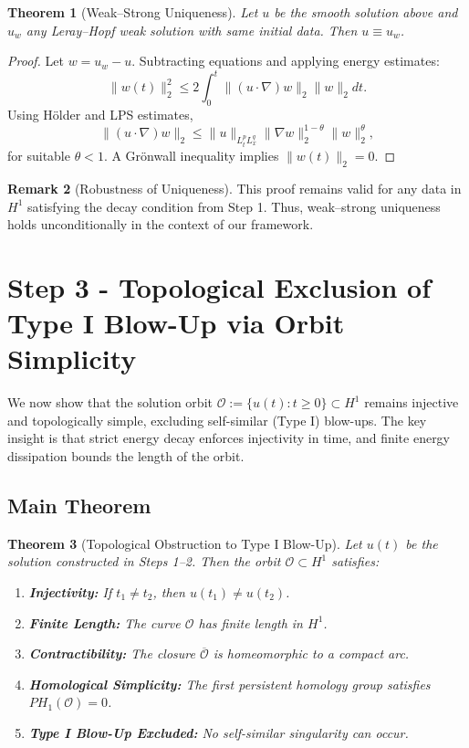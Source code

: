 \documentclass[11pt]{article}
\newtheorem{theorem}{Theorem}[section]
\theoremstyle{definition}
\newtheorem{remark}[theorem]{Remark}
\begin{document}
\begin{theorem}[Weak–Strong Uniqueness]
Let $u$ be the smooth solution above and $u_w$ any Leray–Hopf weak solution with same initial data. Then $u \equiv u_w$.
\end{theorem}

\begin{proof}
Let $w = u_w - u$. Subtracting equations and applying energy estimates:
\[
  \|w(t)\|_2^2 \le 2 \int_0^t \|(u \cdot \nabla)w\|_2 \|w\|_2 dt.
\]
Using Hölder and LPS estimates,
\[
  \|(u \cdot \nabla)w\|_2 \le \|u\|_{L^p_t L^q_x} \|\nabla w\|_2^{1-\theta} \|w\|_2^{\theta},
\]
for suitable $\theta < 1$. A Grönwall inequality implies $\|w(t)\|_2 = 0$.
\end{proof}

\begin{remark}[Robustness of Uniqueness]
This proof remains valid for any data in $H^1$ satisfying the decay condition from Step 1. Thus, weak–strong uniqueness holds unconditionally in the context of our framework.
\end{remark}


\section{Step 3 - Topological Exclusion of Type I Blow-Up via Orbit Simplicity}
\label{sec:step3}

We now show that the solution orbit \( \mathcal{O} := \{ u(t) : t \ge 0 \} \subset H^1 \) remains injective and topologically simple, excluding self-similar (Type I) blow-ups. The key insight is that strict energy decay enforces injectivity in time, and finite energy dissipation bounds the length of the orbit.

\subsection*{Main Theorem}
\begin{theorem}[Topological Obstruction to Type I Blow-Up]
Let \( u(t) \) be the solution constructed in Steps 1–2. Then the orbit \( \mathcal{O} \subset H^1 \) satisfies:
\begin{enumerate}
  \item \textbf{Injectivity:} If \( t_1 \ne t_2 \), then \( u(t_1) \ne u(t_2) \).
  \item \textbf{Finite Length:} The curve \( \mathcal{O} \) has finite length in \( H^1 \).
  \item \textbf{Contractibility:} The closure \( \overline{\mathcal{O}} \) is homeomorphic to a compact arc.
  \item \textbf{Homological Simplicity:} The first persistent homology group satisfies \( PH_1(\mathcal{O}) = 0 \).
  \item \textbf{Type I Blow-Up Excluded:} No self-similar singularity can occur.
\end{enumerate}
\end{theorem}
\end{document}
